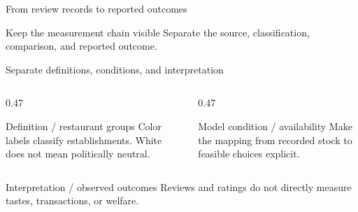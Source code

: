 \documentclass[aspectratio=169,11pt]{beamer}
\begin{document}
\begin{frame}{From review records to reported outcomes}
\begin{center}
\end{center}
\vspace{0.75cm}
\begin{center}\begin{minipage}{23.9cm}
\begin{block}{Keep the measurement chain visible}
Separate the source, classification, comparison, and reported outcome.
\end{block}
\end{minipage}\end{center}
\end{frame}

\begin{frame}{Separate definitions, conditions, and interpretation}
\begin{columns}[T,onlytextwidth]
\begin{column}{0.47\textwidth}
\begin{block}{Definition / restaurant groups}
Color labels classify establishments. White does not mean politically neutral.
\end{block}
\end{column}
\begin{column}{0.47\textwidth}
\begin{alertblock}{Model condition / availability}
Make the mapping from recorded stock to feasible choices explicit.
\end{alertblock}
\end{column}
\end{columns}
\vspace{1cm}
\begin{exampleblock}{Interpretation / observed outcomes}
Reviews and ratings do not directly measure tastes, transactions, or welfare.
\end{exampleblock}
\end{frame}
\end{document}

